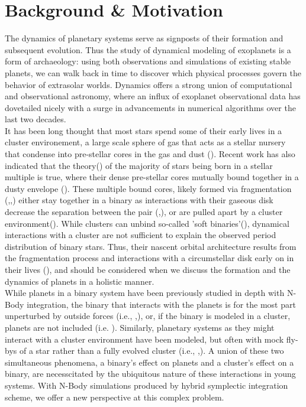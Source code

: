 \documentclass[manuscript]{aastex631}
\begin{document}
\section{Background \& Motivation}
\indent The dynamics of planetary systems serve as signposts of their formation and subsequent evolution. Thus the study of dynamical modeling 
of exoplanets is a form of archaeology: using both observations and simulations of existing stable planets, we can walk back in 
time to discover which physical processes govern the behavior of extrasolar worlds.  Dynamics offers a strong union of computational 
and observational astronomy, where an influx of exoplanet observational data has dovetailed nicely with a surge in advancements in numerical algorithms
over the last two decades. \\
\indent It has been long thought that most stars spend some of their early lives in a cluster environement, a large scale sphere of gas that acts as a stellar nursery
 that condense into pre-stellar cores in the gas and dust (\cite{lad03}). Recent work has also indicated that the theory(\cite{kro95}) of the majority of stars 
 being born in a stellar multiple is true, where their dense pre-stellar cores mutually bound together in a dusty envelope (\cite{sad17}). 
 These multiple bound cores, likely formed
 via fragmentation (\cite{bon94},\cite{bat03},\cite{tur09}) either stay together in a binary as interactions with their gaseous
 disk decrease the separation between the pair (\cite{bat00},\cite{bat03}), or are pulled apart by a cluster environment(\cite{kro01}). 
 While clusters can unbind so-called 'soft binaries'(\cite{kro01}), dynamical interactions with a cluster are not sufficient to explain the observed
 period distribution of binary stars. Thus, their nascent orbital architecture results from the fragmentation process and interactions with a circumstellar disk
 early on in their lives (\cite{krobur01}), and should be considered when we discuss the formation and the dynamics of planets in a holistic manner.\\
 \indent While planets in a binary system have been 
 previously studied in depth with N-Body integration, the binary that interacts with the planets is for the most part unperturbed by outside forces 
 (i.e., \cite{hol99},\cite{hag07}),
 or, if the binary is modeled in a cluster, planets are not included (i.e. \cite{krobur01}). Similarly, planetary systems as they might interact with a cluster environment
 have been modeled, but often with mock fly-bys of a star rather than a fully evolved cluster (i.e., \cite{rec09},\cite{cat20}). A union of these two simultaneous phenomena,
 a binary's effect on planets and a cluster's effect on a binary, are necesscitated by the ubiquitous nature of these interactions in young systems. With N-Body simulations
 produced by hybrid symplectic integration scheme, we offer a new perspective at this complex problem. 
\end{document}
